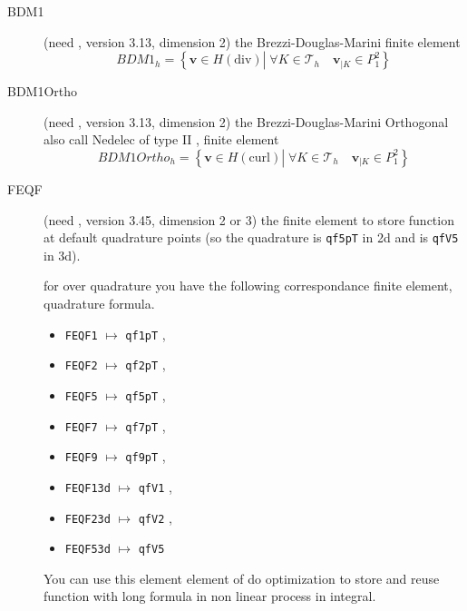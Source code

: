 \documentclass[a4paper,twoside,12pt]{book}
\begin{document}
\begin{description}
    \item[BDM1]  (need , version 3.13, dimension 2) the Brezzi-Douglas-Marini finite element 
     \begin{equation}
         BDM1_{h} = \left\{ \mathbf{v} \in H(\textrm{div}) \left|\; \forall K \in
         \mathcal{T}_{h} \quad   \mathbf{v}_{|K} \in P_1^2
         \right.\right\}
         \label{eq:BDM1}
     \end{equation}
        
    \item[BDM1Ortho]  (need , version 3.13, dimension 2) the Brezzi-Douglas-Marini Orthogonal also call
    Nedelec of type II , finite element 
       \begin{equation}
         BDM1Ortho_{h} = \left\{ \mathbf{v} \in H(\textrm{curl}) \left|\; \forall K \in
         \mathcal{T}_{h} \quad   \mathbf{v}_{|K} \in P_1^2
         \right.\right\}
         \label{eq:BDM1Ortho}
     \end{equation}
   \item[FEQF]   (need , version 3.45, dimension 2 or 3) the finite element to store 
   function at default quadrature points (so the  quadrature is \texttt{qf5pT} in 2d and is   \texttt{qfV5} in 3d).
   
   for over quadrature you have the following correspondance  finite element, quadrature formula. 
    \begin{itemize}
      \item \texttt{FEQF1} $\mapsto$ \texttt{qf1pT}  , 
      \item \texttt{FEQF2} $\mapsto$ \texttt{qf2pT}  , 
      \item \texttt{FEQF5} $\mapsto$ \texttt{qf5pT}  , 
      \item \texttt{FEQF7} $\mapsto$ \texttt{qf7pT}  , 
      \item \texttt{FEQF9} $\mapsto$ \texttt{qf9pT}  , 
      \item \texttt{FEQF13d} $\mapsto$ \texttt{qfV1}  , 
      \item \texttt{FEQF23d} $\mapsto$ \texttt{qfV2}  , 
      \item \texttt{FEQF53d} $\mapsto$ \texttt{qfV5}   
    \end{itemize}
   You can use this element element of do optimization to store and reuse  function with long formula in non linear process in integral. 
    
     \end{description}
\end{document}
